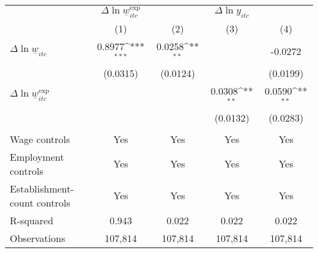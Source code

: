 {
\def\sym#1{\ifmmode^{#1}\else\(^{#1}\)\fi}
\begin{tabular}{l*{4}{c}}
\hline\hline
          &\multicolumn{1}{c}{$\Delta \ln \underline{w}_{itc}^{\text{exp}}$}&\multicolumn{3}{c}{$\Delta \ln y_{itc}$}                \\\cmidrule(lr){2-2}\cmidrule(lr){3-5}
          &\multicolumn{1}{c}{(1)}         &\multicolumn{1}{c}{(2)}         &\multicolumn{1}{c}{(3)}         &\multicolumn{1}{c}{(4)}         \\
\hline
$\Delta \ln \underline{w}_{itc}$&   0.8977\sym{***}&   0.0258\sym{**} &                  &  -0.0272         \\
          & (0.0315)         & (0.0124)         &                  & (0.0199)         \\
[1em]
$\Delta \ln \underline{w}_{itc}^{\text{exp}}$&                  &                  &   0.0308\sym{**} &   0.0590\sym{**} \\
          &                  &                  & (0.0132)         & (0.0283)         \\
\hline
\vspace{-2mm}&                  &                  &                  &                  \\
Wage controls&      Yes         &      Yes         &      Yes         &      Yes         \\
Employment controls&      Yes         &      Yes         &      Yes         &      Yes         \\
Establishment-count controls&      Yes         &      Yes         &      Yes         &      Yes         \\
R-squared &    0.943         &    0.022         &    0.022         &    0.022         \\
Observations&  107,814         &  107,814         &  107,814         &  107,814         \\
\hline\hline
\end{tabular}
}
